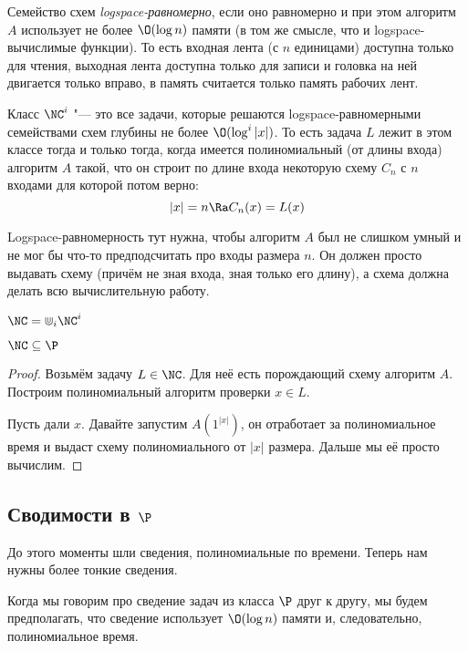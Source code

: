 	\begin{Def}
		Семейство схем \textit{logspace-равномерно}, если оно равномерно и при этом алгоритм $A$ использует не более $\O(\log n)$ памяти (в том же смысле, что и logspace-вычислимые функции).
		То есть входная лента (с $n$ единицами) доступна только для чтения, выходная лента доступна только для записи и головка на ней двигается только вправо,
		в память считается только память рабочих лент.
	\end{Def}
	\begin{Def}
		Класс $\NC^i$ "--- это все задачи, которые решаются logspace-равномерными семействами схем глубины не более $\O(\log^i |x|)$.
		То есть задача $L$ лежит в этом классе тогда и только тогда, когда имеется полиномиальный (от длины входа) алгоритм $A$ такой,
		что он строит по длине входа некоторую схему $C_n$ с $n$ входами для которой потом верно:
		\[
			|x| = n \Ra C_n(x) = L(x)
		\]
	\end{Def}
	\begin{Rem}
		Logspace-равномерность тут нужна, чтобы алгоритм $A$ был не слишком умный и не мог бы что-то предподсчитать про входы размера $n$.
		Он должен просто выдавать схему (причём не зная входа, зная только его длину), а схема должна делать всю вычислительную работу.
	\end{Rem}
	\begin{Def}
		$\NC = \Cup_i \NC^i$
	\end{Def}

	\begin{lemma}
		$\NC \subseteq \P$
	\end{lemma}
	\begin{proof}
		Возьмём задачу $L \in \NC$.
		Для неё есть порождающий схему алгоритм $A$.
		Построим полиномиальный алгоритм проверки $x \in L$.

		Пусть дали $x$.
		Давайте запустим $A(1^{|x|})$, он отработает за полиномиальное время и выдаст схему полиномиального от $|x|$ размера.
		Дальше мы её просто вычислим.
	\end{proof}

\subsection[Сводимости в P]{Сводимости в $\P$}
	\begin{Rem}
		До этого моменты шли сведения, полиномиальные по времени.
		Теперь нам нужны более тонкие сведения.
	\end{Rem}
	\begin{Def}
		Когда мы говорим про сведение задач из класса $\P$ друг к другу, мы будем предполагать, что
		сведение использует $\O(\log n)$ памяти и, следовательно, полиномиальное время.
	\end{Def}

